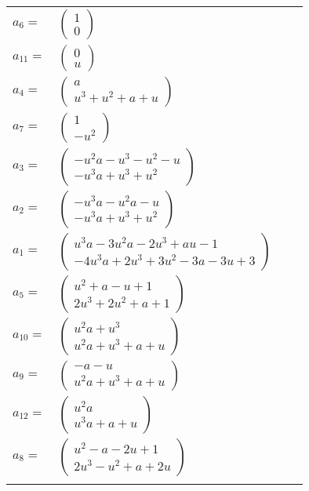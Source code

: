 \documentclass[1p]{elsarticle_modified}
\theoremstyle{definition}
\begin{document}
\begin{tabular}{m{7pt} m{180pt} m{7pt} m{180pt} }
\flushright $a_{6}=$&$\begin{pmatrix}1\\0\end{pmatrix}$ \\
\flushright $a_{11}=$&$\begin{pmatrix}0\\u\end{pmatrix}$ \\
\flushright $a_{4}=$&$\begin{pmatrix}a\\u^3+u^2+a+u\end{pmatrix}$ \\
\flushright $a_{7}=$&$\begin{pmatrix}1\\- u^2\end{pmatrix}$ \\
\flushright $a_{3}=$&$\begin{pmatrix}- u^2 a- u^3- u^2- u\\- u^3 a+u^3+u^2\end{pmatrix}$ \\
\flushright $a_{2}=$&$\begin{pmatrix}- u^3 a- u^2 a- u\\- u^3 a+u^3+u^2\end{pmatrix}$ \\
\flushright $a_{1}=$&$\begin{pmatrix}u^3 a-3 u^2 a-2 u^3+a u-1\\-4 u^3 a+2 u^3+3 u^2-3 a-3 u+3\end{pmatrix}$ \\
\flushright $a_{5}=$&$\begin{pmatrix}u^2+a- u+1\\2 u^3+2 u^2+a+1\end{pmatrix}$ \\
\flushright $a_{10}=$&$\begin{pmatrix}u^2 a+u^3\\u^2 a+u^3+a+u\end{pmatrix}$ \\
\flushright $a_{9}=$&$\begin{pmatrix}- a- u\\u^2 a+u^3+a+u\end{pmatrix}$ \\
\flushright $a_{12}=$&$\begin{pmatrix}u^2 a\\u^3 a+a+u\end{pmatrix}$ \\
\flushright $a_{8}=$&$\begin{pmatrix}u^2- a-2 u+1\\2 u^3- u^2+a+2 u\end{pmatrix}$\\&\end{tabular}
\end{document}
